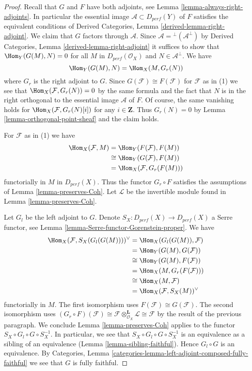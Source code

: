 \begin{proof}
Recall that $G$ and $F$ have both adjoints, see
Lemma \ref{lemma-always-right-adjoints}. In particular
the essential image $\mathcal{A} \subset D_{perf}(Y)$ of $F$
satisfies the equivalent conditions of
Derived Categories, Lemma \ref{derived-lemma-right-adjoint}.
We claim that $G$ factors through $\mathcal{A}$.
Since $\mathcal{A} = {}^\perp(\mathcal{A}^\perp)$ by
Derived Categories, Lemma \ref{derived-lemma-right-adjoint}
it suffices to show that $\Hom_Y(G(M), N) = 0$ for
all $M$ in $D_{perf}(\mathcal{O}_X)$ and $N \in \mathcal{A}^\perp$.
We have
$$
\Hom_Y(G(M), N) = \Hom_X(M, G_r(N))
$$
where $G_r$ is the right adjoint to $G$. Since
$G(\mathcal{F}) \cong F(\mathcal{F})$ for $\mathcal{F}$ as in (1)
we see that $\Hom_X(\mathcal{F}, G_r(N)) = 0$ by the same formula
and the fact that $N$ is in the right orthogonal to the essential
image $\mathcal{A}$ of $F$. Of course, the
same vanishing holds for $\Hom_X(\mathcal{F}, G_r(N)[i])$
for any $i \in \mathbf{Z}$. Thus $G_r(N) = 0$ by
Lemma \ref{lemma-orthogonal-point-sheaf}
and the claim holds.

\medskip\noindent
For $\mathcal{F}$ as in (1) we have
\begin{align*}
\Hom_X(\mathcal{F}, M)
& =
\Hom_Y(F(\mathcal{F}), F(M)) \\
& \cong
\Hom_Y(G(\mathcal{F}), F(M)) \\
& =
\Hom_X(\mathcal{F}, G_r(F(M)))
\end{align*}
functorially in $M$ in $D_{perf}(X)$. Thus the functor $G_r \circ F$
satisfies the assumptions of Lemma \ref{lemma-preserves-Coh}.
Let $\mathcal{L}$ be the invertible module found in
Lemma \ref{lemma-preserves-Coh}.

\medskip\noindent
Let $G_l$ be the left adjoint to $G$. Denote
$S_X : D_{perf}(X) \to D_{perf}(X)$ a Serre functor, see
Lemma \ref{lemma-Serre-functor-Gorenstein-proper}.
We have
\begin{align*}
\Hom_X(\mathcal{F}, S_X(G_l(G(M))) )^\vee
& =
\Hom_X(G_l(G(M)), \mathcal{F}) \\
& =
\Hom_Y(G(M), G(\mathcal{F})) \\
& \cong
\Hom_Y(G(M), F(\mathcal{F})) \\
& =
\Hom_X(M, G_r(F(\mathcal{F}))) \\
& \cong
\Hom_X(M, \mathcal{F}) \\
& =
\Hom_X(\mathcal{F}, S_X(M))^\vee
\end{align*}
functorially in $M$. The first isomorphism uses
$F(\mathcal{F}) \cong G(\mathcal{F})$.
The second isomorphism uses $(G_r \circ F)(\mathcal{F}) \cong
\mathcal{F} \otimes_{\mathcal{O}_X}^\mathbf{L} \mathcal{L} \cong \mathcal{F}$
by the result of the previous paragraph.
We conclude Lemma \ref{lemma-preserves-Coh} applies to
the functor $S_X \circ G_l \circ G \circ S_X^{-1}$.
In particular, we see that $S_X \circ G_l \circ G \circ S_X^{-1}$
is an equivalence as a sibling of an equivalence
(Lemma \ref{lemma-sibling-faithful}). Hence
$G_l \circ G$ is an equivalence. By
Categories, Lemma \ref{categories-lemma-left-adjoint-composed-fully-faithful}
we see that $G$ is fully faithful.


\end{proof}
